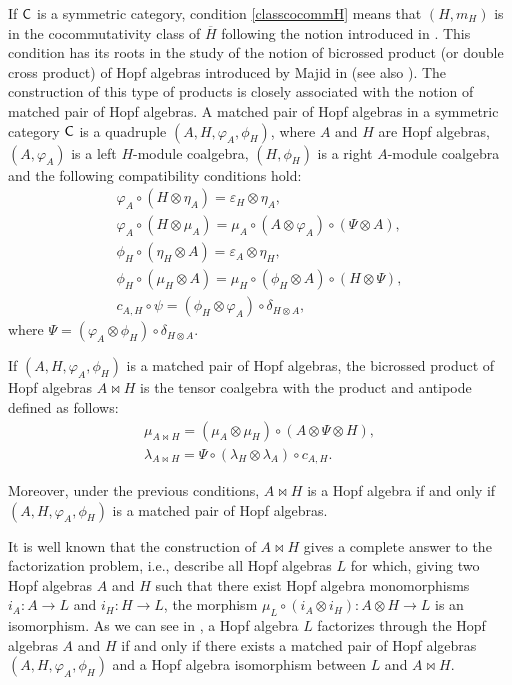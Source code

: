 \documentclass[pdftex]{sigma}
\numberwithin{equation}{section}
\begin{document}
\begin{Remark}
If ${\sf C}$ is a symmetric category, condition \eqref{classcocommH} means that $(H,m_{H})$ is in the cocommutativity class of $\overline{H}$ following the notion introduced in \cite[Definitions~2.1 and~2.2]{CCH}. This condition has its roots in the study of the notion of bicrossed product (or double cross product) of Hopf algebras introduced by Majid in \cite{M1990} (see also \cite{M1995}). The construction of this type of products is closely associated with the notion of matched pair of Hopf algebras. A matched pair of Hopf algebras in a symmetric category ${\sf C}$ is a quadruple $(A,H,\varphi_{A}, \phi_{H})$, where $A$ and $H$ are Hopf algebras, $(A,\varphi_{A})$ is a left $H$-module coalgebra, $(H, \phi_{H}) $ is a right $A$-module coalgebra and the following compatibility conditions hold:
\begin{gather*}
\varphi_{A}\circ (H\otimes \eta_{A})= \varepsilon_{H}\otimes \eta_{A}, \\
\varphi_{A}\circ (H\otimes \mu_{A})= \mu_{A}\circ (A\otimes \varphi_{A})\circ (\Psi \otimes A ), \\
\phi_{H}\circ (\eta_{H}\otimes A)= \varepsilon_{A}\otimes \eta_{H}, \\
\phi_{H}\circ (\mu_{H}\otimes A)=\mu_{H}\circ (\phi_{H}\otimes A)\circ (H\otimes \Psi), \\
c_{A,H}\circ \psi=(\phi_{H}\otimes \varphi_{A})\circ \delta_{H\otimes A},
\end{gather*}
where $\Psi=( \varphi_{A}\otimes \phi_{H})\circ \delta_{H\otimes A}$.

If $(A,H,\varphi_{A}, \phi_{H})$ is a matched pair of Hopf algebras, the bicrossed product of Hopf algebras $A\bowtie H$
 is the tensor coalgebra with the product and antipode defined as follows:
 \begin{gather*}
 \mu_{A\bowtie H}=(\mu_{A}\otimes \mu_{H})\circ (A\otimes \Psi\otimes H),\\
 \lambda_{A\bowtie H}=\Psi\circ (\lambda_{H}\otimes \lambda_{A})\circ c_{A,H}.
 \end{gather*}

 Moreover, under the previous conditions, $A\bowtie H$ is a Hopf algebra if and only if $(A,H,\varphi_{A}, \phi_{H})$ is a matched pair of Hopf algebras.

It is well known that the construction of $A\bowtie H$ gives a complete answer to the factorization problem, i.e., describe all Hopf algebras $L$ for which, giving two Hopf algebras $A$ and $H$ such that there exist Hopf algebra monomorphisms $i_{A}\colon A\rightarrow L$ and $i_{H}\colon H\rightarrow L$, the morphism $\mu_{L}\circ (i_{A}\otimes i_{H})\colon A\otimes H\rightarrow L$ is an isomorphism. As we can see in \cite[Theorem 7.2.3]{M1995}, a Hopf algebra $L$ factorizes through the Hopf algebras $A$ and $H$ if and only if there exists a matched pair of Hopf algebras $(A,H,\varphi_{A}, \phi_{H})$ and a Hopf algebra isomorphism between $L$ and $A\bowtie H$.


\end{Remark}
\end{document}
